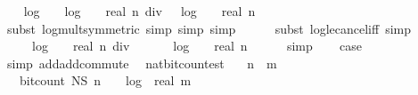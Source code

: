 \begin{isabellebody}
\ \ \isamarkupfalse%
\ {\isachardoublequoteopen}log\ {}\ {}\ {\isacharplus}{\kern0pt}\ log\ {}\ {\isacharparenleft}{\kern0pt}{}\ {\isacharplus}{\kern0pt}\ real\ {\isacharparenleft}{\kern0pt}n\ div\ {}{\isacharparenright}{\kern0pt}{\isacharparenright}{\kern0pt}\ {\isasymle}\ log\ {}\ {\isacharparenleft}{\kern0pt}{}\ {\isacharplus}{\kern0pt}\ real\ n{\isacharparenright}{\kern0pt}{\isachardoublequoteclose}\isanewline
\ \ \ \ \isamarkupfalse%
\ {\isacharparenleft}{\kern0pt}subst\ log{\isacharunderscore}{\kern0pt}mult{\isacharbrackleft}{\kern0pt}symmetric{\isacharbrackright}{\kern0pt}{\isacharcomma}{\kern0pt}\ simp{\isacharcomma}{\kern0pt}\ simp{\isacharcomma}{\kern0pt}\ simp{\isacharparenright}{\kern0pt}\isanewline
\ \ \ \ \isamarkupfalse%
\ {\isacharparenleft}{\kern0pt}subst\ log{\isacharunderscore}{\kern0pt}le{\isacharunderscore}{\kern0pt}cancel{\isacharunderscore}{\kern0pt}iff{\isacharcomma}{\kern0pt}\ simp{\isacharplus}{\kern0pt}{\isacharparenright}{\kern0pt}\isanewline
\ \ \isamarkupfalse%
\ {\isachardoublequoteopen}{}\ {\isacharplus}{\kern0pt}\ {}\ {\isacharasterisk}{\kern0pt}\ log\ {}\ {\isacharparenleft}{\kern0pt}{}\ {\isacharplus}{\kern0pt}\ real\ {\isacharparenleft}{\kern0pt}n\ div\ {}{\isacharparenright}{\kern0pt}{\isacharparenright}{\kern0pt}\ {\isacharplus}{\kern0pt}\ {}\ {\isasymle}\ {}\ {\isacharasterisk}{\kern0pt}\ log\ {}\ {\isacharparenleft}{\kern0pt}{}\ {\isacharplus}{\kern0pt}\ real\ n{\isacharparenright}{\kern0pt}{\isachardoublequoteclose}\isanewline
\ \ \ \ \isamarkupfalse%
\ simp\isanewline
\ \ \isamarkupfalse%
\ {\isacharquery}{\kern0pt}case\ \isamarkupfalse%
\ {}\ \isamarkupfalse%
\ {\isacharparenleft}{\kern0pt}simp\ add{\isacharcolon}{\kern0pt}add{\isachardot}{\kern0pt}commute{\isacharparenright}{\kern0pt}\ \isanewline
{}\isamarkupfalse%
%
\endisatagproof
{\isafoldproof}%
%
\isadelimproof
\isanewline
%
\endisadelimproof
\isanewline
{}\isamarkupfalse%
\ nat{\isacharunderscore}{\kern0pt}bit{\isacharunderscore}{\kern0pt}count{\isacharunderscore}{\kern0pt}est{\isacharcolon}{\kern0pt}\isanewline
\ \ \ {\isachardoublequoteopen}n\ {\isasymle}\ m{\isachardoublequoteclose}\isanewline
\ \ \ {\isachardoublequoteopen}bit{\isacharunderscore}{\kern0pt}count\ {\isacharparenleft}{\kern0pt}N\isactrlsub S\ n{\isacharparenright}{\kern0pt}\ {\isasymle}\ {}\ {\isacharasterisk}{\kern0pt}\ log\ {}\ {\isacharparenleft}{\kern0pt}{}{\isacharplus}{\kern0pt}real\ m{\isacharparenright}{\kern0pt}\ {\isacharplus}{\kern0pt}\ {}{\isachardoublequoteclose}\isanewline

\end{isabellebody}
